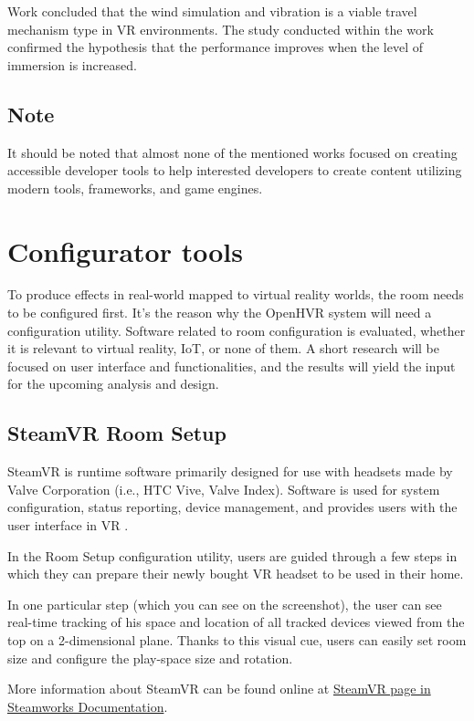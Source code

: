 Work concluded that the wind simulation and vibration is a viable travel
mechanism type in VR environments. The study conducted within
the work confirmed the hypothesis that the performance improves when the level of
immersion is increased.

\subsection*{Note}

It should be noted that almost none of the mentioned works focused on
creating accessible developer tools to help interested developers to create
content utilizing modern tools, frameworks, and game engines.


\hypertarget{x-configurator-tools}{\section{Configurator tools}}
To produce effects in real-world mapped to virtual reality worlds,
the room needs to be configured first.
It’s the reason why the OpenHVR system will need a configuration utility.
Software related to room configuration is evaluated, whether it is relevant
to virtual reality, IoT, or none of them. A short research will be focused on 
user interface and functionalities, and the results will yield 
the input for the upcoming analysis and design.


\hypertarget{x-steamvr-room-setup}{\subsection{SteamVR Room Setup}}
SteamVR is runtime software primarily designed for use with headsets made
by Valve Corporation (i.e., HTC Vive, Valve Index). Software is used for
system configuration, status reporting, device management, and provides users
with the user interface in VR \cite{steamvr}.


In the Room Setup configuration utility, users are guided through a few steps
in which they can prepare their newly bought VR headset to be used in their
home.


In one particular step (which you can see on the screenshot), the user can see
real-time tracking of his space and location of all tracked devices viewed
from the top on a 2-dimensional plane. Thanks to this visual cue, users can
easily set room size and configure the play-space size and rotation.


More information about SteamVR can be found online at
\href{https://partner.steamgames.com/doc/features/steamvr/info}{SteamVR page in Steamworks Documentation}.

